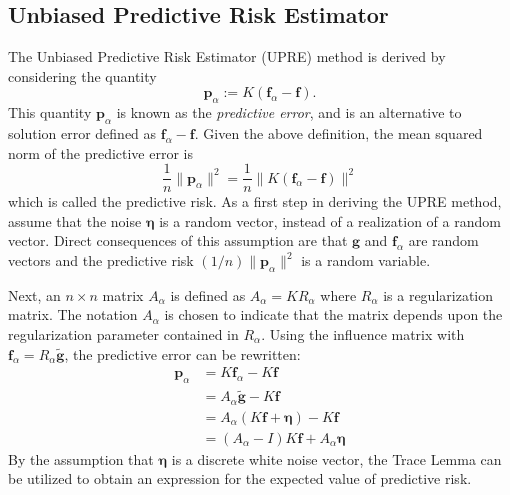 \documentclass[12pt]{article}
\newcommand{\gVec}{\mathbf{g}}	%
\newcommand{\gnoiseVec}{\widetilde{\mathbf{g}}}	%
\newcommand{\kMat}{K}	%
\newcommand{\fVec}{\mathbf{f}}	%
\newcommand{\regparam}{\alpha}
\newcommand{\R}{R_{\regparam}}	%
\newcommand{\freg}{\fVec_{\regparam}}	%
\newcommand{\noise}{\eta}	%
\newcommand{\noiseVec}{\bm{\noise}}	%
\newcommand{\PE}{\mathbf{p}_{\regparam}}	%
\newcommand{\A}{A_{\regparam}}	%
\begin{document}
\subsection{Unbiased Predictive Risk Estimator} \label{sec:Unbiased Predictive Risk Estimator}
The Unbiased Predictive Risk Estimator (UPRE) method is derived by considering the quantity
\[\PE := \kMat(\freg - \fVec).\]
This quantity $\PE$ is known as the \textit{predictive error}, and is an alternative to solution error defined as $\freg - \fVec$. Given the above definition, the mean squared norm of the predictive error is
\[\frac{1}{n}\|\PE\|^2 = \frac{1}{n}\|\kMat(\freg - \fVec)\|^2\]
which is called the predictive risk.  As a first step in deriving the UPRE method, assume that the noise $\noiseVec$ is a random vector, instead of a realization of a random vector. Direct consequences of this assumption are that $\gVec$ and $\freg$ are random vectors and the predictive risk $(1/n)\|\PE\|^2$ is a random variable. \par
Next, an $n \times n$ matrix $\A$ is defined as $\A = \kMat\R$ where $\R$ is a regularization matrix. The notation $\A$ is chosen to indicate that the matrix depends upon the regularization parameter contained in $\R$. Using the influence matrix with $\freg = \R\gnoiseVec$, the predictive error can be rewritten:
\begin{align*}
\PE &= \kMat\freg - \kMat\fVec \\
&= \A\gnoiseVec - \kMat\fVec \\
&= \A(\kMat\fVec + \noiseVec) - \kMat\fVec \\
&= (\A - I)\kMat\fVec + \A\noiseVec
\end{align*}
By the assumption that $\noiseVec$ is a discrete white noise vector, the Trace Lemma can be utilized to obtain an expression for the expected value of predictive risk.
\end{document}
